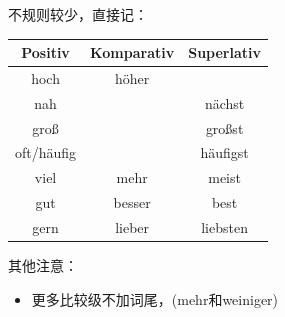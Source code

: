 不规则较少，直接记：
\begin{center}
    \begin{tabular}{|c|c|c|}
        \hline
        \rowcolor{gray}
        Positiv    & Komparativ & Superlativ \\
        \hline
        hoch       & höher      &            \\
        nah        &            & nächst     \\
        \hline
        groß       &            & großst     \\
        oft/häufig &            & häufigst   \\
        \hline
        viel       & mehr       & meist      \\
        gut        & besser     & best       \\
        gern       & lieber     & liebsten   \\
        \hline
    \end{tabular}
\end{center}

其他注意：
\begin{itemize}
    \item 更多比较级不加词尾，(mehr和weiniger) \\
\end{itemize}